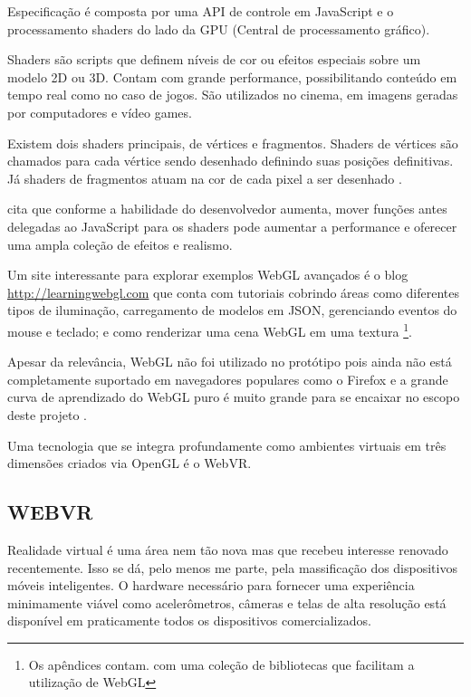 Especificação é composta por uma API de controle em JavaScript
e o processamento shaders do lado da GPU (Central de processamento
gráfico). 

Shaders são scripts que definem níveis de cor ou efeitos especiais
sobre um modelo 2D ou 3D. Contam com grande performance, possibilitando
conteúdo em tempo real como no caso de jogos. São utilizados no
cinema, em imagens geradas por computadores e vídeo games.

Existem dois shaders principais, de vértices e fragmentos. Shaders de
vértices são chamados para cada vértice sendo desenhado definindo
suas posições definitivas. Já shaders de fragmentos atuam na cor de
cada pixel a ser desenhado \autocite[pp.15]{3daps}.

\cite{html5mostwanted} cita que conforme a habilidade do desenvolvedor
aumenta, mover funções antes delegadas ao JavaScript para os shaders
pode aumentar a performance e oferecer uma ampla coleção de efeitos e
realismo.

Um site interessante para explorar exemplos WebGL avançados é o blog
 \url{http://learningwebgl.com} que conta com tutoriais cobrindo áreas
como diferentes tipos de iluminação, carregamento de modelos em JSON,
gerenciando eventos do mouse e teclado; e como renderizar uma cena WebGL
em uma textura \autocite[pp.42]{3daps}\footnote{Os apêndices contam.
com uma coleção de bibliotecas que facilitam a utilização de WebGL}.

Apesar da relevância, WebGL não foi utilizado no protótipo pois
ainda não está completamente suportado em navegadores populares como
o Firefox e a grande curva de aprendizado do WebGL puro é muito grande
para se encaixar no escopo deste projeto .

Uma tecnologia que se integra profundamente como ambientes virtuais
em três dimensões criados via OpenGL é o WebVR.
\subsection{WEBVR}
Realidade virtual é uma área nem tão nova mas que recebeu interesse
renovado recentemente. Isso se dá, pelo menos me parte, pela
massificação dos dispositivos móveis inteligentes. O hardware
necessário para fornecer uma experiência minimamente viável como
acelerômetros, câmeras e telas de alta resolução está disponível
em praticamente todos os dispositivos comercializados.

